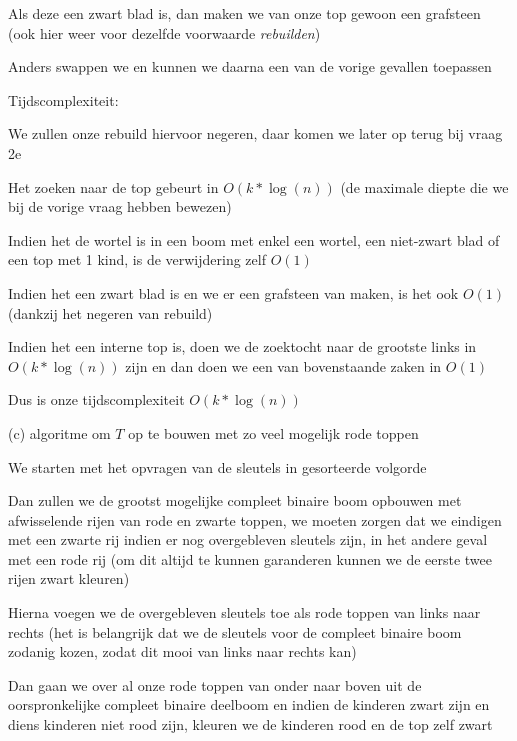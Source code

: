 \documentclass{article}
\begin{document}
Als deze een zwart blad is, dan maken we van onze top gewoon een grafsteen (ook hier weer voor dezelfde voorwaarde \textit{rebuilden})

Anders swappen we en kunnen we daarna een van de vorige gevallen toepassen

\vspace{0.2cm}

Tijdscomplexiteit:

We zullen onze rebuild hiervoor negeren, daar komen we later op terug bij vraag 2e

Het zoeken naar de top gebeurt in $O(k * \log (n))$ (de maximale diepte die we bij de vorige vraag hebben bewezen)

Indien het de wortel is in een boom met enkel een wortel, een niet-zwart blad of een top met 1 kind, is de verwijdering zelf $O(1)$

Indien het een zwart blad is en we er een grafsteen van maken, is het ook $O(1)$ (dankzij het negeren van rebuild)

Indien het een interne top is, doen we de zoektocht naar de grootste links in $O(k * \log (n))$ zijn en dan doen we een van bovenstaande zaken in $O(1)$

Dus is onze tijdscomplexiteit $O(k * \log (n))$ 

\vspace{0.5cm}

\Large (c) algoritme om $T$ op te bouwen met zo veel mogelijk rode toppen
\vspace{0.3cm}

\large
We starten met het opvragen van de sleutels in gesorteerde volgorde

Dan zullen we de grootst mogelijke compleet binaire boom opbouwen met afwisselende rijen van rode en zwarte toppen, we moeten zorgen dat we eindigen met een zwarte rij indien er nog overgebleven sleutels zijn, in het andere geval met een rode rij (om dit altijd te kunnen garanderen kunnen we de eerste twee rijen zwart kleuren)

Hierna voegen we de overgebleven sleutels toe als rode toppen van links naar rechts (het is belangrijk dat we de sleutels voor de compleet binaire boom zodanig kozen, zodat dit mooi van links naar rechts kan)

Dan gaan we over al onze rode toppen van onder naar boven uit de oorspronkelijke compleet binaire deelboom en indien de kinderen zwart zijn en diens kinderen niet rood zijn, kleuren we de kinderen rood en de top zelf zwart
\end{document}
